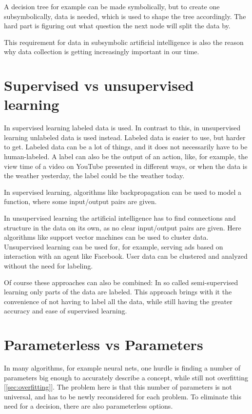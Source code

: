A decision tree for example can be made symbolically, but to create one subsymbolically, data is needed, which is used to shape the tree accordingly.
The hard part is figuring out what question the next node will split the data by. 

This requirement for data in subsymbolic artificial intelligence is also the reason why data collection is getting increasingly important in our time. 

\section{Supervised vs unsupervised learning} \cite[p. 695]{MA}
In supervised learning labeled data is used. In contrast to this, in unsupervised learning unlabeled data is used instead. 
Labeled data is easier to use, but harder to get. Labeled data can be a lot of things, and it does not necessarily have to be human-labeled. A label can also be the output of an action, like, for example, the view time of a video on YouTube presented in different ways, or when the data is the weather yesterday, the label could be the weather today.

In supervised learning, algorithms like backpropagation can be used to model a function, where some input/output pairs are given.

In unsupervised learning the artificial intelligence has to find connections and structure in the data on its own, as no clear input/output pairs are given.
Here algorithms like support vector machines can be used to cluster data. Unsupervised learning can be used for, for example, serving ads based on interaction with an agent like Facebook. User data can be clustered and analyzed without the need for labeling.

Of course these approaches can also be combined: In so called semi-supervised learning only parts of the data are labeled. This approach brings with it the convenience of not having to label all the data, while still having the greater accuracy and ease of supervised learning. \cite{semisupervised}

\section{Parameterless vs Parameters} \cite[p. 737]{MA}
In many algorithms, for example neural nets, one hurdle is finding a number of parameters big enough to accurately describe a concept, while still not  overfitting [\autoref{sec:overfitting}]. The problem here is that this number of parameters is not universal, and has to be newly reconsidered for each problem. To eliminate this need for a decision, there are also parameterless options. 

